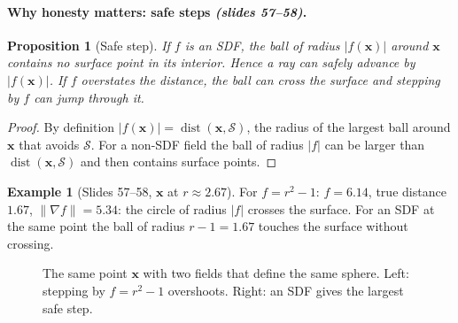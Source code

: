 \documentclass[11pt,a4paper]{article}
\newcommand{\Surf}{\mathcal{S}}
\newcommand{\vx}{\bm{x}}
\newcommand{\norm}[1]{\lVert #1\rVert}
\newcommand{\abs}[1]{\lvert #1\rvert}
\DeclareMathOperator{\dist}{dist}
\theoremstyle{definition}
\newtheorem{example}[definition]{Example}
\theoremstyle{plain}
\newtheorem{proposition}[definition]{Proposition}
\theoremstyle{remark}
\newcommand{\slides}[1]{\texorpdfstring{\emph{(#1)}}{(#1)}}
\begin{document}
\paragraph{Why honesty matters: safe steps \slides{slides 57--58}.}
\begin{proposition}[Safe step]
If $f$ is an SDF, the ball of radius $\abs{f(\vx)}$ around $\vx$ contains no surface point in its interior. Hence a ray can safely advance by $\abs{f(\vx)}$. If $f$ overstates the distance, the ball can cross the surface and stepping by $f$ can \emph{jump through} it.
\end{proposition}
\begin{proof}
By definition $\abs{f(\vx)}=\dist(\vx,\Surf)$, the radius of the largest ball around $\vx$ that avoids $\Surf$. For a non-SDF field the ball of radius $\abs{f}$ can be larger than $\dist(\vx,\Surf)$ and then contains surface points.
\end{proof}

\begin{example}[Slides 57--58, $\vx$ at $r\approx2.67$]
For $f=r^2-1$: $f=6.14$, true distance $1.67$, $\norm{\nabla f}=5.34$: the circle of radius $\abs f$ crosses the surface. For an SDF at the same point the ball of radius $r-1=1.67$ touches the surface without crossing.
\end{example}

\begin{figure}[ht]
\centering
{}
\caption{The same point $\vx$ with two fields that define the same sphere. Left: stepping by $f=r^2-1$ overshoots. Right: an SDF gives the largest safe step.}
\end{figure}
\end{document}
